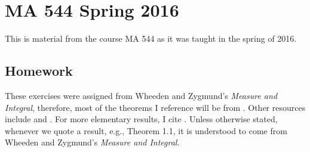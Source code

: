 

\chapter{MA 544 Spring 2016}
\thispagestyle{empty} This is material from the course MA 544 as it was
taught in the spring of 2016.  \bigskip
\section{Homework}
These exercises were assigned from Wheeden and Zygmund's \emph{Measure and
  Integral}, therefore, most of the theorems I reference will be from
\cite{wheeden-zygmund}. Other resources include \cite{folland} and
\cite{royden}. For more elementary results, I cite \cite{rudin-1}. Unless
otherwise stated, whenever we quote a result, e.g., Theorem 1.1, it is
understood to come from Wheeden and Zygmund's \emph{Measure and Integral}.

\bigskip


